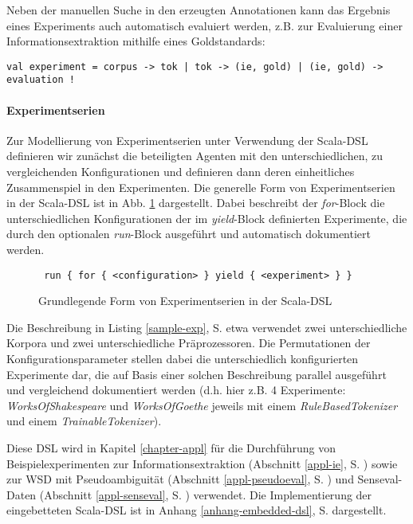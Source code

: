\documentclass[abstracton, 12pt]{scrartcl}
\begin{document}
Neben der manuellen Suche in den erzeugten Annotationen kann das Ergebnis eines Experiments auch automatisch evaluiert werden, z.B. zur Evaluierung einer Informationsextraktion mithilfe eines Goldstandards:

\begin{lstlisting}
val experiment = corpus -> tok | tok -> (ie, gold) | (ie, gold) -> evaluation !
\end{lstlisting}

\paragraph{Experimentserien} 

Zur Modellierung von Experimentserien unter Verwendung der Scala-DSL definieren wir zunächst die beteiligten Agenten mit den unterschiedlichen, zu vergleichenden Konfigurationen und definieren dann deren einheitliches Zusammenspiel in den Experimenten. Die generelle Form von Experimentserien in der Scala-DSL ist in Abb. \ref{dsl-scala-form} dargestellt. Dabei beschreibt der \emph{for}-Block die unterschiedlichen Konfigurationen der im \emph{yield}-Block definierten Experimente, die durch den optionalen \emph{run}-Block ausgeführt und automatisch dokumentiert werden.

\begin{figure}[hb]
\begin{center}
	 \lstinline! run { for { <configuration> } yield { <experiment> } } !
  \caption{Grundlegende Form von Experimentserien in der Scala-DSL}
  \label{dsl-scala-form}
\end{center}
\end{figure}

Die Beschreibung in Listing \ref{sample-exp}, S. \pageref{sample-exp} etwa verwendet zwei unterschiedliche Korpora und zwei unterschiedliche Präprozessoren. Die Permutationen der Konfigurationsparameter stellen dabei die unterschiedlich konfigurierten Experimente dar, die auf Basis einer solchen Beschreibung parallel ausgeführt und vergleichend dokumentiert werden (d.h. hier z.B. 4 Experimente: \emph{WorksOfShakespeare} und \emph{WorksOfGoethe} jeweils mit einem \emph{RuleBasedTokenizer} und einem \emph{TrainableTokenizer}).

Diese DSL wird in Kapitel \ref{chapter-appl} für die Durchführung von Beispielexperimenten zur Informationsextraktion (Abschnitt \ref{appl-ie}, S. \pageref{appl-ie}) sowie zur WSD mit Pseudoambiguität (Abschnitt \ref{appl-pseudoeval}, S. \pageref{appl-pseudoeval}) und Senseval-Daten (Abschnitt \ref{appl-senseval}, S. \pageref{appl-senseval}) verwendet. Die Implementierung der eingebetteten Scala-DSL ist in Anhang \ref{anhang-embedded-dsl}, S. \pageref{anhang-embedded-dsl} dargestellt.
\end{document}
